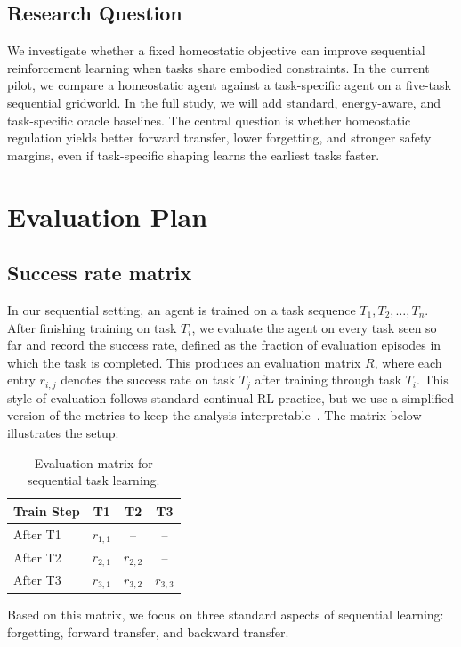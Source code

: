 \documentclass[sigplan,10pt]{acmart}
\begin{document}
\subsection{Research Question}
We investigate whether a fixed homeostatic objective can improve
sequential reinforcement learning when tasks share embodied
constraints. In the current pilot, we compare a homeostatic agent
against a task-specific agent on a five-task sequential gridworld. In
the full study, we will add standard, energy-aware, and task-specific
oracle baselines. The central question is whether homeostatic
regulation yields better forward transfer, lower forgetting, and
stronger safety margins, even if task-specific shaping learns the
earliest tasks faster.

 
\section{Evaluation Plan}
\subsection{Success rate matrix}
In our sequential setting, an agent is trained on a task sequence
$T_1, T_2, \ldots, T_n$. After finishing training on task $T_i$, we
evaluate the agent on every task seen so far and record the success
rate, defined as the fraction of evaluation episodes in which the task
is completed. This produces an evaluation matrix $R$, where each entry
$r_{i,j}$ denotes the success rate on task $T_j$ after training through
task $T_i$. This style of evaluation follows standard continual RL
practice, but we use a simplified version of the metrics to keep the
analysis interpretable~\cite{continualworld2021,cora2022}. The matrix
below illustrates the setup:
\begin{table}[h]
\centering
\begin{tabular}{lccc}
\hline
\textbf{Train Step} & \textbf{T1} & \textbf{T2} & \textbf{T3} \\
\hline
After T1 & $r_{1,1}$ & --   & --   \\
After T2 & $r_{2,1}$ & $r_{2,2}$ & --   \\
After T3 & $r_{3,1}$ & $r_{3,2}$ & $r_{3,3}$ \\
\hline
\end{tabular}
\caption{Evaluation matrix for sequential task learning.}
\label{tab:sequential_success}
\end{table}

Based on this matrix, we focus on three standard aspects of sequential
learning: forgetting, forward transfer, and backward transfer.
\end{document}
